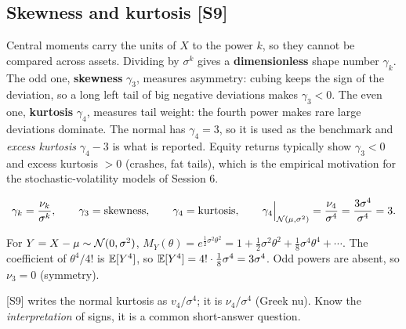 \documentclass[10pt]{article}
\begin{document}
\subsection{Skewness and kurtosis [S9]}
\begin{idea}
Central moments carry the units of $X$ to the power $k$, so they cannot be compared across assets. Dividing by $\sigma^k$ gives a \textbf{dimensionless} shape number $\gamma_k$. The odd one, \textbf{skewness} $\gamma_3$, measures asymmetry: cubing keeps the sign of the deviation, so a long left tail of big negative deviations makes $\gamma_3<0$. The even one, \textbf{kurtosis} $\gamma_4$, measures tail weight: the fourth power makes rare large deviations dominate. The normal has $\gamma_4=3$, so it is used as the benchmark and \emph{excess kurtosis} $\gamma_4-3$ is what is reported. Equity returns typically show $\gamma_3<0$ and excess kurtosis $>0$ (crashes, fat tails), which is the empirical motivation for the stochastic-volatility models of Session 6.
\end{idea}
\[\gamma_k=\frac{\nu_k}{\sigma^k},\qquad \gamma_3=\text{skewness},\qquad\gamma_4=\text{kurtosis},\qquad \gamma_4\Big|_{\mathcal{N}(\mu,\sigma^2)}=\frac{\nu_4}{\sigma^4}=\frac{3\sigma^4}{\sigma^4}=3.\]
\begin{where}
\end{where}
\begin{deriv}[{Why $\nu_4=3\sigma^4$ for a normal \beyond{} (via the MGF of the next entries)}]
For $Y=X-\mu\sim\mathcal{N}(0,\sigma^2)$, $M_Y(\theta)=e^{\frac12\sigma^2\theta^2}=1+\tfrac12\sigma^2\theta^2+\tfrac18\sigma^4\theta^4+\cdots$. The coefficient of $\theta^4/4!$ is $\mathbb{E}[Y^4]$, so $\mathbb{E}[Y^4]=4!\cdot\tfrac18\sigma^4=3\sigma^4$. Odd powers are absent, so $\nu_3=0$ (symmetry).
\end{deriv}
\begin{exam}
\flag{} [S9] writes the normal kurtosis as $v_4/\sigma^4$; it is $\nu_4/\sigma^4$ (Greek nu). Know the \emph{interpretation} of signs, it is a common short-answer question.
\end{exam}
\end{document}
